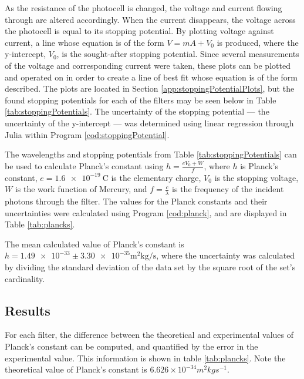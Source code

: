 \documentclass[a4paper]{article}
\begin{document}
\qq As the resistance of the photocell is changed, the voltage and current
flowing through are altered accordingly. When the current disappears, the
voltage across the photocell is equal to its stopping potential. By plotting
voltage against current, a line whose equation is of the form \( V = mA + V_0 \)
is produced, where the y-intercept, \( V_0 \), is the sought-after stopping
potential. Since several measurements of the voltage and corresponding current
were taken, these plots can be plotted and operated on in order to create a line
of best fit whose equation is of the form described. The plots are located in
Section \ref{app:stoppingPotentialPlots}, but the found stopping potentials for
each of the filters may be seen below in Table \ref{tab:stoppingPotentials}. The
uncertainty of the stopping potential --- the uncertainty of the y-intercept ---
was determined using linear regression through Julia within Program
\ref{cod:stoppingPotential}.

 
\qq The wavelengths and stopping potentials from Table
\ref{tab:stoppingPotentials} can be used to calculate Planck's constant using 
\( h = \frac{e V_0 + W}{f} \), where \( h \) is Planck's constant, \( e =
\SI{1.6e-19}{\coulomb} \) is the elementary charge, \( V_0 \) is the stopping
voltage, \( W \) is the work function of Mercury, and \( f = \frac{c}{\lambda}
\) is the frequency of the incident photons through the filter. The values for
the Planck constants and their uncertainties were calculated using Program
\ref{cod:planck}, and are displayed in Table \ref{tab:plancks}.


The mean calculated value of Planck's constant is \( h = \num{1.49e-33} \pm
\num{3.30e-35} \si{\square\meter\kilo\gram\per\second} \), where the uncertainty
was calculated by dividing the standard deviation of the data set by the square
root of the set's cardinality.
 

\subsection{Results}

For each filter, the difference between the theoretical and experimental values of Planck's constant can be computed, and quantified by the error in the experimental value. This information is shown in table \ref{tab:plancks}. Note the theoretical value of Planck's constant is $6.626 \times 10^{-34} m^2kg s^{-1}$.
\end{document}
